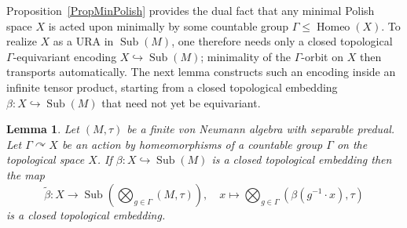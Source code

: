 \documentclass[12pt]{amsart} %
\theoremstyle{plain}
\newtheorem{lemma}[theorem]{Lemma}
\theoremstyle{definition}
\DeclareMathOperator{\Sub}{Sub}
\DeclareMathOperator{\Homeo}{Homeo}
\begin{document}
Proposition~\ref{PropMinPolish} provides the dual fact that any minimal Polish space $X$ is acted upon minimally by some countable group $\Gamma\leq\Homeo(X)$. To realize $X$ as a URA in $\Sub(M)$, one therefore needs only a closed topological $\Gamma$-equivariant encoding $X\hookrightarrow\Sub(M)$; minimality of the $\Gamma$-orbit on $X$ then transports automatically. The next lemma constructs such an encoding inside an infinite tensor product, starting from a closed topological embedding $\beta:X\hookrightarrow\Sub(M)$ that need not yet be equivariant.
\begin{lemma}\label{LemInfiniteTens} Let $(M,\tau)$ be a finite von Neumann algebra with separable predual. Let $\Gamma\curvearrowright X$ be an action by homeomorphisms of a countable group $\Gamma$ on the topological space $X$. If $\beta:X\hookrightarrow\Sub(M)$ is a closed topological embedding then the map
$$\widetilde{\beta}:X\to\Sub\left(\bigotimes_{g\in\Gamma}(M,\tau)\right),\quad x\mapsto\bigotimes_{g\in\Gamma}(\beta(g^{-1}\cdot x),\tau)$$
is a closed topological embedding.\end{lemma}
\end{document}
